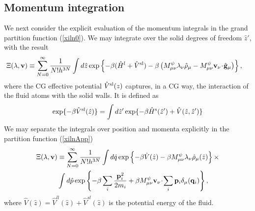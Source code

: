 \documentclass[b5paper,openright,10pt]{book}
\newcommand{\esc}{\!\cdot\!}
\begin{document}
\begin{appendices}
\section{Momentum integration}
We next consider the explicit  evaluation of the momentum integrals in
the grand partition function (\ref{xiln0}).  We may integrate over the
solid degrees of freedom $\hat{z}'$, with the result
\begin{align}
&\Xi(\lambda,{\bf v})
\equiv
 \sum_{N=0}^\infty \frac{1}{N!h^{3N}}
\int d\hat{z}
\exp\left\{-\beta (\hat{H}^l +\hat{V}^{\rm sl} )-\beta
\left(M^\psi_{\mu\nu}\lambda_\nu\hat{\rho}_{\mu} 
-M^\psi_{\mu\nu}{\bf v}_\nu\esc\hat{\bf g}_{\mu} \right)\right\},
\label{xilnApp}
\end{align}
where the CG effective potential $\hat{V}^{\rm sl}(z)$ captures, in a CG way, the interaction
of the fluid atoms with the solid walls. It is defined as
\begin{align}
  \exp\{-\beta \hat{V}^{\rm sl}(\hat{z})\}=\int d\hat{z}' 
  \exp\{-\beta \hat{H}^{\rm s}(\hat{z}')+\hat{V}(\hat{z},\hat{z}')\}
\end{align}
We may separate the integrals over position and momenta explicitly in  the partition
function  (\ref{xilnApp})
\begin{align}
\Xi(\lambda,{\bf v})
&\equiv
 \sum_{N=0}^\infty \frac{1}{N!h^{3N}}
\int d\hat{q}
\exp\left\{-\beta \hat{V}(\hat{z})-\beta
M^\psi_{\mu\nu}\lambda_\nu\hat{\rho}_{\mu}(\hat{z})\right\}
\times \nonumber \\
&\int d\hat{p}
\exp\left\{-\beta\sum_i\frac{{\bf p}_i^2}{2m_i}+\beta M^\psi_{\mu\nu}{\bf v}_\nu\esc\sum_i{\bf p}_i\delta_\mu({\bf q}_i)\right\},
\label{xilnApp2}
\end{align}
where $\hat{V}(\hat{z})=\hat{V}^{ll}(\hat{z})+\hat{V}^{sl}(\hat{z})$ is the potential energy of the fluid. 


\end{appendices}
\end{document}
